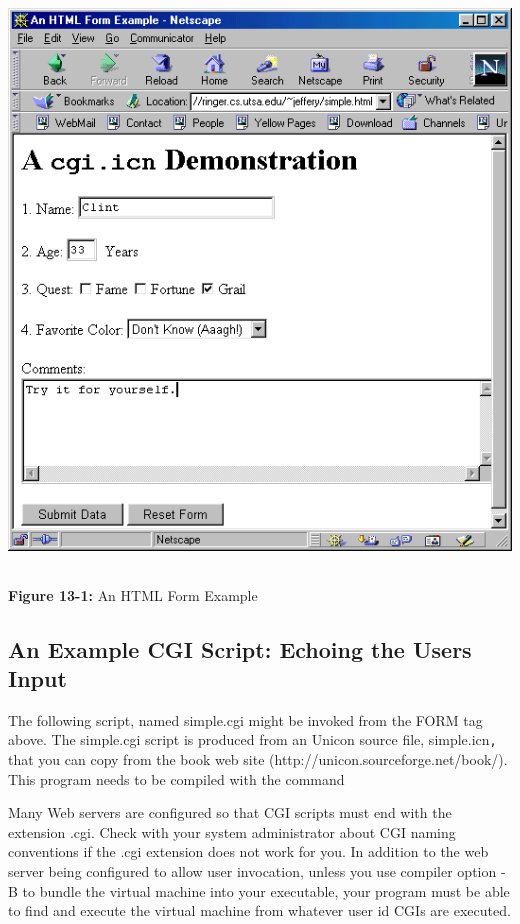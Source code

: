 \begin{center}
\includegraphics[width=5.5516in,height=5.989in]{ub-img/ub-img44.png}
\end{center}

{\sffamily\bfseries Figure 13-1:}
{\sffamily An HTML Form Example}

\subsection{An Example CGI Script: Echoing the User{\textquotesingle}s
Input}

The following script, named \textsf{simple.cgi} might be invoked from
the \textsf{FORM} tag above. The \textsf{simple.cgi} script is produced
from an Unicon source file, \textsf{simple.icn}\texttt{,} that you can
copy from the book web site
(\textsf{http://unicon.sourceforge.net/book/}). This program needs to
be compiled with the command


Many Web servers are configured so that CGI scripts must end with the
extension \textsf{.cgi}. Check with your system administrator about CGI
naming conventions if the \textsf{.cgi} extension does not work for
you. In addition to the web server being configured to allow user
invocation, unless you use compiler option \textsf{{}-B} to bundle the
virtual machine into your executable, your program must be able to find
and execute the virtual machine from whatever user id
CGI{\textquotesingle}s are executed.

